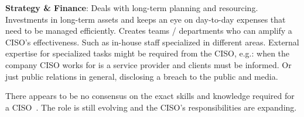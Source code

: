 \textbf{Strategy \& Finance}: Deals with long-term planning and resourcing.
Investments in long-term assets and keeps an eye on day-to-day expenses that need to be managed efficiently.
Creates teams / departments who can amplify a CISO's effectiveness. Such as in-house staff specialized in different areas.
External expertise for specialized tasks might be required from the CISO, e.g.: when the company CISO works for is a service provider and
clients must be informed. Or just public relations in general, disclosing a breach to the public and media.

There appears to be no consensus on the exact skills and knowledge required for a CISO~\cite{cotton}.
The role is still evolving and the CISO's responsibilities are expanding.
